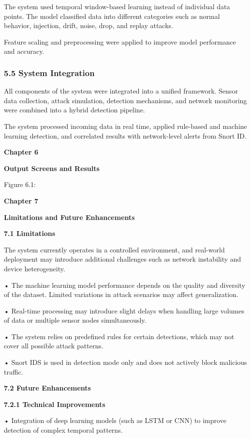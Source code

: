 The system used temporal window-based learning instead of individual
data points. The model classified data into different categories such as
normal behavior, injection, drift, noise, drop, and replay attacks.

Feature scaling and preprocessing were applied to improve model
performance and accuracy.

\subsubsection{\texorpdfstring{\textbf{5.5 System
Integration}}{5.5 System Integration}}\label{system-integration}

All components of the system were integrated into a unified framework.
Sensor data collection, attack simulation, detection mechanisms, and
network monitoring were combined into a hybrid detection pipeline.

The system processed incoming data in real time, applied rule-based and
machine learning detection, and correlated results with network-level
alerts from Snort ID.

\textbf{Chapter 6}

\textbf{Output Screens and Results}

Figure 6.1:

\textbf{Chapter 7}

\textbf{Limitations and Future Enhancements}

\textbf{7.1 Limitations}

The system currently operates in a controlled environment, and
real-world deployment may introduce additional challenges such as
network instability and device heterogeneity.

• The machine learning model performance depends on the quality and
diversity of the dataset. Limited variations in attack scenarios may
affect generalization.

• Real-time processing may introduce slight delays when handling large
volumes of data or multiple sensor nodes simultaneously.

• The system relies on predefined rules for certain detections, which
may not cover all possible attack patterns.

• Snort IDS is used in detection mode only and does not actively block
malicious traffic.

\textbf{7.2 Future Enhancements}

\textbf{7.2.1 Technical Improvements}

• Integration of deep learning models (such as LSTM or CNN) to improve
detection of complex temporal patterns.

